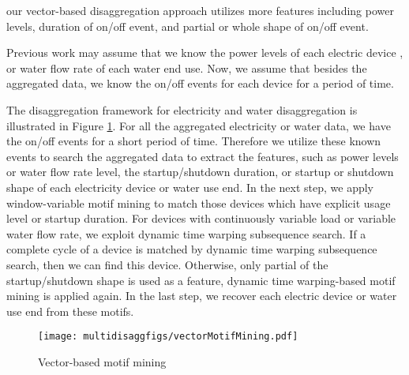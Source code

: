 our vector-based disaggregation approach utilizes more features including power levels, 
duration of on/off event, and partial or whole shape of on/off event.

Previous work may assume that we know the power levels of each electric device , 
or water flow rate of each water end use. 
Now, we assume that besides the aggregated data, we know the on/off events for each device for a period of time. 

The disaggregation framework for electricity and water disaggregation is illustrated in Figure \ref{fig_vectormotifmining}. 
For all the aggregated electricity or water data, 
we have the on/off events for a short period of time. 
Therefore we utilize these known events to search the aggregated data 
to extract the features, such as power levels or water flow rate level, 
the startup/shutdown duration, or startup or shutdown shape of each electricity device or water use end. 
In the next step, we apply window-variable motif mining to 
match those devices which have explicit usage level or startup duration. 
For devices with continuously variable load or variable water flow rate, 
we exploit dynamic time warping subsequence search. 
If a complete cycle of a device is matched by dynamic time warping subsequence search, 
then we can find this device. 
Otherwise, only partial of the startup/shutdown shape is used as a feature, 
dynamic time warping-based motif mining is applied again. 
In the last step, we recover each electric device or water use end from these motifs. 

\begin{figure}[!t]
\centering
\texttt{[image: multidisaggfigs/vectorMotifMining.pdf]}
\caption{Vector-based motif mining}
\label{fig_vectormotifmining}
\end{figure}
